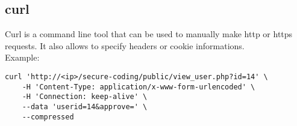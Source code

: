 \subsection{curl}
Curl is a command line tool that can be used to manually make http or https requests. It also allows to specify headers or cookie informations.\\
Example:
\begin{lstlisting}
curl 'http://<ip>/secure-coding/public/view_user.php?id=14' \
    -H 'Content-Type: application/x-www-form-urlencoded' \
    -H 'Connection: keep-alive' \
    --data 'userid=14&approve=' \
    --compressed
\end{lstlisting}
